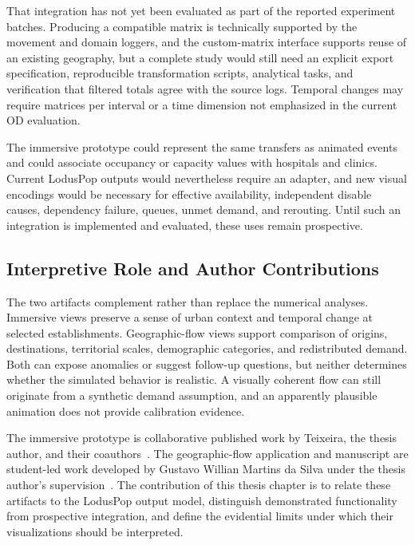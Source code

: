 That integration has not yet been evaluated as part of the reported experiment batches. Producing a compatible matrix is technically supported by the movement and domain loggers, and the custom-matrix interface supports reuse of an existing geography, but a complete study would still need an explicit export specification, reproducible transformation scripts, analytical tasks, and verification that filtered totals agree with the source logs. Temporal changes may require matrices per interval or a time dimension not emphasized in the current OD evaluation.

The immersive prototype could represent the same transfers as animated events and could associate occupancy or capacity values with hospitals and clinics. Current LodusPop outputs would nevertheless require an adapter, and new visual encodings would be necessary for effective availability, independent disable causes, dependency failure, queues, unmet demand, and rerouting. Until such an integration is implemented and evaluated, these uses remain prospective.

\subsection{Interpretive Role and Author Contributions}
\label{visualization:contribution}

The two artifacts complement rather than replace the numerical analyses. Immersive views preserve a sense of urban context and temporal change at selected establishments. Geographic-flow views support comparison of origins, destinations, territorial scales, demographic categories, and redistributed demand. Both can expose anomalies or suggest follow-up questions, but neither determines whether the simulated behavior is realistic. A visually coherent flow can still originate from a synthetic demand assumption, and an apparently plausible animation does not provide calibration evidence.

The immersive prototype is collaborative published work by Teixeira, the thesis author, and their coauthors~\citep{teixeira2024visualization}. The geographic-flow application and manuscript are student-led work developed by Gustavo Willian Martins da Silva under the thesis author's supervision~\citep{silva2026geospatial}. The contribution of this thesis chapter is to relate these artifacts to the LodusPop output model, distinguish demonstrated functionality from prospective integration, and define the evidential limits under which their visualizations should be interpreted.

